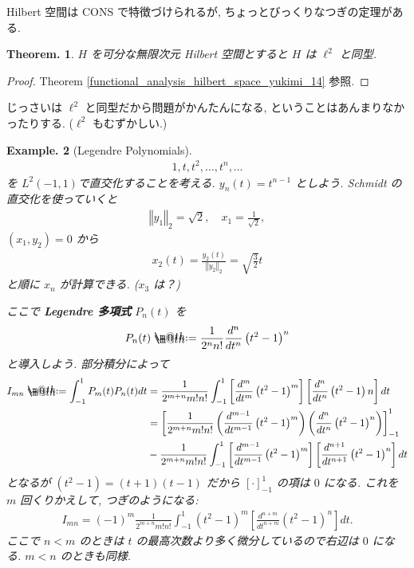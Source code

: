 \documentclass[openany, a4paper, oneside]{jsbook}
\makeatletter
\newcommand*{\defeq}{\mathrel{\rlap{%
\raisebox{0.3ex}{$\m@th\cdot$}}%
\raisebox{-0.3ex}{$\m@th\cdot$}}%
=}
\theoremstyle{break}
\theoremstyle{breakdefn}
\newtheorem{thm}{Theorem.}[section]
\newtheorem{ex}[thm]{Example.}
\newcommand{\norm}[1]{\left\Vert#1\right\Vert}
\newcommand{\rbk}[1]{\left (#1\right)}
\newcommand{\sqbk}[1]{\left[#1\right]}
\makeatother
\begin{document}
Hilbert 空間は CONS で特徴づけられるが,
ちょっとびっくりなつぎの定理がある.
\begin{thm}
 $H$ を可分な無限次元 Hilbert 空間とすると $H$ は $\ell^2$ と同型.
\end{thm}
\begin{proof}
Theorem \ref{functional_analysis_hilbert_space_yukimi_14} 参照.
\end{proof}
じっさいは $\ell^2$ と同型だから問題がかんたんになる,
ということはあんまりなかったりする.
($\ell^2$ もむずかしい.)

\begin{ex}[Legendre Polynomials]
\begin{align}
 1, t, t^2, \dots, t^n, \dots
\end{align}
を $L^2(-1, 1) $で直交化することを考える.
$y_n(t) = t^{n-1}$ としよう.
Schmidt の直交化を使っていくと
\begin{align}
 \norm{y_1}_2
 =
 \sqrt{2}, \quad
 x_1
 =
 \frac{1}{\sqrt{2}},
\end{align}
$(x_1, y_2) = 0$ から
\begin{align}
 x_2(t)
 =
 \frac{y_2(t)}{\norm{y_2}_2}
 =
 \sqrt{\frac{3}{2}}t
\end{align}
と順に $x_n$ が計算できる.
($x_3$ は？)

ここで \textbf{Legendre 多項式} $P_n(t)$ を
\begin{align}
 P_n(t)
 \defeq
 \frac{1}{2^n n!} \frac{d^n}{dt^n} \rbk{t^2 - 1}^n
\end{align}
と導入しよう.
部分積分によって
\begin{align}
 I_{mn}
 \defeq
 \int_{-1}^1 P_m(t) P_n(t) dt
 &=
 \frac{1}{2^{m+n} m!n!} \int_{-1}^1
  \sqbk{\frac{d^m}{dt^m} \rbk{t^2 - 1}^m}
  \sqbk{\frac{d^n}{dt^n} \rbk{t^2 - 1}n} dt \\
 &=
 \sqbk{\frac{1}{2^{m+n} m!n!} \rbk{\frac{d^{m-1}}{dt^{m-1}} \rbk{t^2 - 1}^m} \rbk{\frac{d^n}{dt^n} \rbk{t^2 - 1}^n}}_{-1}^1 \\
 &-
  \frac{1}{2^{m+n} m!n!} \int_{-1}^1
   \sqbk{\frac{d^{m-1}}{dt^{m-1}} \rbk{t^2 - 1}^m}
   \sqbk{\frac{d^{n+1}}{dt^{n+1}} \rbk{t^2 - 1}^n} dt
\end{align}
となるが $(t^2 - 1) = (t+1)(t-1)$ だから $[\cdot]_{-1}^1$ の項は $0$ になる.
これを $m$ 回くりかえして, つぎのようになる:
\begin{align}
 I_{mn}
 =
 (-1)^m \frac{1}{2^{m+n} m!n!} \int_{-1}^1
  \rbk{t^2 - 1}^m
  \sqbk{\frac{d^{n+m}}{dt^{n+m}} \rbk{t^2 - 1}^n} dt.
\end{align}
ここで $n<m$ のときは $t$ の最高次数より多く微分しているので右辺は $0$ になる.
$m<n$ のときも同様.


\end{ex}
\end{document}
